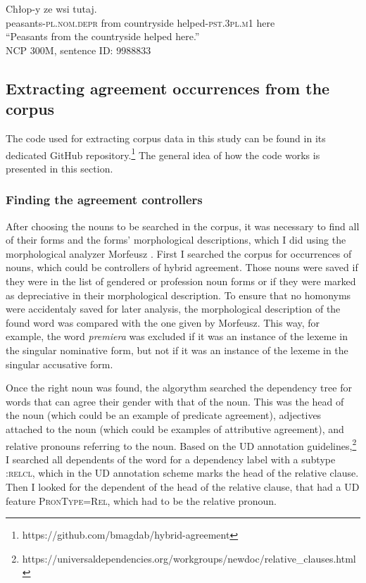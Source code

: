 \begin{exe}
  \ex\label{ex:depr-occurrence}
  \gll Chłop-y ze wsi  tutaj.\\
  peasants\textsc{-pl.nom.depr} from countryside helped\textsc{-pst.3pl.m1} here\\
  \glt ``Peasants from the countryside helped here.''\\
  NCP 300M, sentence ID: 9988833
\end{exe}

\subsection{Extracting agreement occurrences from the corpus}
The code used for extracting corpus data in this study can be found in its dedicated GitHub repository.\footnote{https://github.com/bmagdab/hybrid-agreement} The general idea of how the code works is presented in this section.

\subsubsection{Finding the agreement controllers}
After choosing the nouns to be searched in the corpus, it was necessary to find all of their forms and the forms' morphological descriptions, which I did using the morphological analyzer Morfeusz \citep{kieras_morfeusz_2017}. First I searched the corpus for occurrences of nouns, which could be controllers of hybrid agreement. Those nouns were saved if they were in the list of gendered or profession noun forms or if they were marked as depreciative in their morphological description. To ensure that no homonyms were accidentaly saved for later analysis, the morphological description of the found word was compared with the one given by Morfeusz. This way, for example, the word \textsl{premiera} was excluded if it was an instance of the lexeme  in the singular nominative form, but not if it was an instance of the lexeme  in the singular accusative form.

Once the right noun was found, the algorythm searched the dependency tree for words that can agree their gender with that of the noun. This was the head of the noun (which could be an example of predicate agreement), adjectives attached to the noun (which could be examples of attributive agreement), and relative pronouns referring to the noun. Based on the UD annotation guidelines,\footnote{https://universaldependencies.org/workgroups/newdoc/relative\_clauses.html} I searched all dependents of the word for a dependency label with a subtype \textsc{:relcl}, which in the UD annotation scheme marks the head of the relative clause. Then I looked for the dependent of the head of the relative clause, that had a UD feature \textsc{PronType=Rel}, which had to be the relative pronoun.

